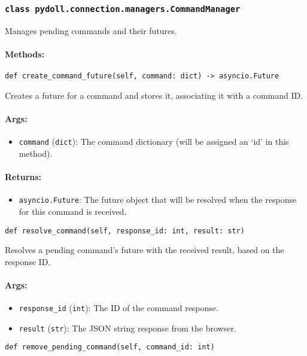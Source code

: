\documentclass{article}
\begin{document}
\subsubsection*{\texttt{class pydoll.connection.managers.CommandManager}}
\noindent Manages pending commands and their futures.

\paragraph{Methods:}
\noindent\texttt{def create\_command\_future(self, command: dict) -> asyncio.Future}

\noindent Creates a future for a command and stores it, associating it with a command ID.

\paragraph{Args:}
\begin{itemize}
    \item \texttt{command} (\texttt{dict}): The command dictionary (will be assigned an `id' in this method).
\end{itemize}

\paragraph{Returns:}
\begin{itemize}
    \item \texttt{asyncio.Future}: The future object that will be resolved when the response for this command is received.
\end{itemize}

\noindent\texttt{def resolve\_command(self, response\_id: int, result: str)}

\noindent Resolves a pending command's future with the received result, based on the response ID.

\paragraph{Args:}
\begin{itemize}
    \item \texttt{response\_id} (\texttt{int}): The ID of the command response.
    \item \texttt{result} (\texttt{str}): The JSON string response from the browser.
\end{itemize}

\noindent\texttt{def remove\_pending\_command(self, command\_id: int)}
\end{document}

